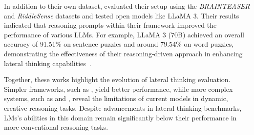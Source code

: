 In addition to their own dataset, \textcite{chenWeakevalStrongEvaluatingEliciting2024} evaluated their setup using the \textit{BRAINTEASER} and \textit{RiddleSense} datasets and tested open models like \ac{LLaMA} 3. Their results indicated that reasoning prompts within their framework improved the performance of various \acp{LLM}. For example, \ac{LLaMA} 3 (70B) achieved an overall accuracy of 91.51\% on sentence puzzles and around 79.54\% on word puzzles, demonstrating the effectiveness of their reasoning-driven approach in enhancing lateral thinking capabilities~\cite{chenWeakevalStrongEvaluatingEliciting2024}.

Together, these works highlight the evolution of lateral thinking evaluation. Simpler frameworks, such as \textcite{jiangBRAINTEASERLateralThinking2023}, yield better performance, while more complex systems, such as \textcite{huangLatEvalInteractiveLLMs2024} and \textcite{chenWeakevalStrongEvaluatingEliciting2024}, reveal the limitations of current models in dynamic, creative reasoning tasks. Despite advancements in lateral thinking benchmarks, \acp{LM}'s abilities in this domain remain significantly below their performance in more conventional reasoning tasks.
